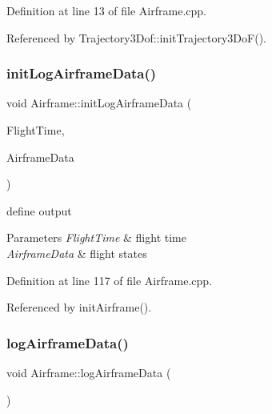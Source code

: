 Definition at line 13 of file Airframe.\+cpp.



Referenced by Trajectory3\+Dof\+::init\+Trajectory3\+Do\+F().

\mbox{\label{class_airframe_ac1c2c7b3b51e6780b544e4df897cb585}} 
\subsubsection{\texorpdfstring{init\+Log\+Airframe\+Data()}{initLogAirframeData()}}
{\footnotesize\ttfamily void Airframe\+::init\+Log\+Airframe\+Data (\begin{DoxyParamCaption}\item[{\hyperlink{group___tools_ga3f1431cb9f76da10f59246d1d743dc2c}{Float64} \&}]{Flight\+Time,  }\item[{Airframe\+Struct \&}]{Airframe\+Data }\end{DoxyParamCaption})}



define output 


\begin{DoxyParams}{Parameters}
{\em Flight\+Time} & flight time \\
\hline
{\em Airframe\+Data} & flight states \\
\hline
\end{DoxyParams}


Definition at line 117 of file Airframe.\+cpp.



Referenced by init\+Airframe().

\mbox{\label{class_airframe_ab5b3c30a5d3d6d5e89b3dfdd0dbd14e4}} 
\subsubsection{\texorpdfstring{log\+Airframe\+Data()}{logAirframeData()}}
{\footnotesize\ttfamily void Airframe\+::log\+Airframe\+Data (\begin{DoxyParamCaption}{ }\end{DoxyParamCaption})}



